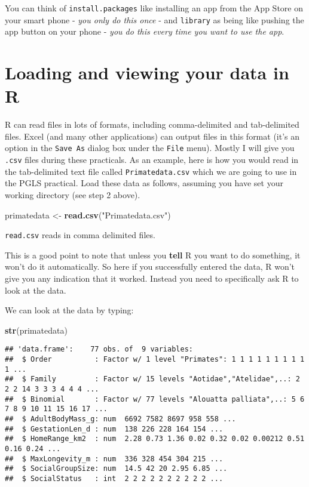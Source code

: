 \documentclass[]{book}
\newenvironment{Shaded}{\begin{snugshade}}{\end{snugshade}}
\newcommand{\KeywordTok}[1]{\textcolor[rgb]{0.13,0.29,0.53}{\textbf{{#1}}}}
\newcommand{\StringTok}[1]{\textcolor[rgb]{0.31,0.60,0.02}{{#1}}}
\newcommand{\NormalTok}[1]{{#1}}
\begin{document}
You can think of \texttt{install.packages} like installing an app from
the App Store on your smart phone - \emph{you only do this once} - and
\texttt{library} as being like pushing the app button on your phone -
\emph{you do this every time you want to use the app}.

\section{Loading and viewing your data in
R}\label{loading-and-viewing-your-data-in-r}

R can read files in lots of formats, including comma-delimited and
tab-delimited files. Excel (and many other applications) can output
files in this format (it's an option in the \texttt{Save\ As} dialog box
under the \texttt{File} menu). Mostly I will give you \texttt{.csv}
files during these practicals. As an example, here is how you would read
in the tab-delimited text file called \texttt{Primatedata.csv} which we
are going to use in the PGLS practical. Load these data as follows,
assuming you have set your working directory (see step 2 above).

\begin{Shaded}
\begin{Highlighting}[]
\NormalTok{primatedata <-}\StringTok{ }\KeywordTok{read.csv}\NormalTok{(}\StringTok{"Primatedata.csv"}\NormalTok{)}
\end{Highlighting}
\end{Shaded}

\texttt{read.csv} reads in comma delimited files.

This is a good point to note that unless you \textbf{tell} R you want to
do something, it won't do it automatically. So here if you successfully
entered the data, R won't give you any indication that it worked.
Instead you need to specifically ask R to look at the data.

We can look at the data by typing:

\begin{Shaded}
\begin{Highlighting}[]
\KeywordTok{str}\NormalTok{(primatedata)}
\end{Highlighting}
\end{Shaded}

\begin{verbatim}
## 'data.frame':    77 obs. of  9 variables:
##  $ Order          : Factor w/ 1 level "Primates": 1 1 1 1 1 1 1 1 1 1 ...
##  $ Family         : Factor w/ 15 levels "Aotidae","Atelidae",..: 2 2 2 14 3 3 3 4 4 4 ...
##  $ Binomial       : Factor w/ 77 levels "Alouatta palliata",..: 5 6 7 8 9 10 11 15 16 17 ...
##  $ AdultBodyMass_g: num  6692 7582 8697 958 558 ...
##  $ GestationLen_d : num  138 226 228 164 154 ...
##  $ HomeRange_km2  : num  2.28 0.73 1.36 0.02 0.32 0.02 0.00212 0.51 0.16 0.24 ...
##  $ MaxLongevity_m : num  336 328 454 304 215 ...
##  $ SocialGroupSize: num  14.5 42 20 2.95 6.85 ...
##  $ SocialStatus   : int  2 2 2 2 2 2 2 2 2 2 ...
\end{verbatim}
\end{document}
